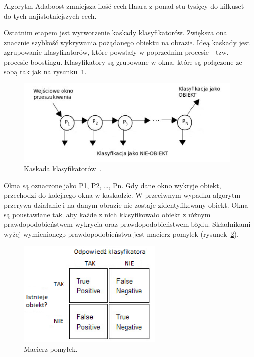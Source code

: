 \documentclass[a4paper,twoside,12pt]{book}
\begin{document}
    Algorytm Adaboost zmniejsza ilość cech Haara z ponad stu tysięcy do kilkuset - do tych najistotniejszych cech.

    Ostatnim etapem jest wytworzenie kaskady klasyfikatorów.
    Zwiększa ona znacznie szybkość wykrywania pożądanego obiektu na obrazie.
    Ideą kaskady jest zgrupowanie klasyfikatorów,
    które powstały w poprzednim procesie - tzw. procesie boostingu.
    Klasyfikatory są grupowane w okna,
    które są połączone ze sobą tak jak na rysunku~\ref{fig.kaskadaHaar}.
    \begin{figure}
        \centering
        \includegraphics[width=11cm]{Obrazy/kaskadaHaar.jpg}
        \caption{Kaskada klasyfikatorów~\cite{kaskadaHaarObraz}.}
        \label{fig.kaskadaHaar}
    \end{figure}
    Okna są oznaczone jako P1, P2, \ldots, Pn.
    Gdy dane okno wykryje obiekt, przechodzi do kolejnego okna w kaskadzie.
    W przeciwnym wypadku algorytm przerywa działanie i na danym obrazie nie zostaje zidentyfikowany obiekt.
    Okna są poustawiane tak, aby każde z nich klasyfikowało obiekt z różnym prawdopodobieństwem wykrycia oraz
    prawdopodobieństwem błędu.
    Składnikami wyżej wymienionego prawdopodobieństwa jest macierz pomyłek (rysunek~\ref{fig.ConfusionMatrix}).

    \begin{figure}[h!]
        \centering
        \includegraphics[width=7cm]{Obrazy/ConfusionMatrix.jpg}
        \caption{Macierz pomyłek.}
        \label{fig.ConfusionMatrix}
    \end{figure}
\end{document}
